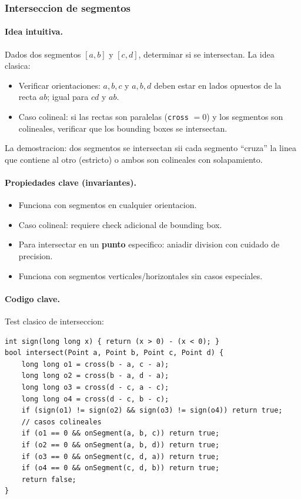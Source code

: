 ﻿\subsubsection{Interseccion de segmentos}

\paragraph{Idea intuitiva.}
Dados dos segmentos $[a, b]$ y $[c, d]$, determinar si se intersectan. La idea clasica:
\begin{itemize}\setlength\itemsep{0pt}
	\item Verificar orientaciones: $a, b, c$ y $a, b, d$ deben estar en lados opuestos de la recta $ab$; igual para $cd$ y $ab$.
	\item Caso colineal: si las rectas son paralelas (\texttt{cross} $= 0$) y los segmentos son colineales, verificar que los bounding boxes se intersectan.
\end{itemize}
La demostracion: dos segmentos se intersectan sii cada segmento ``cruza'' la linea que contiene al otro (estricto) o ambos son colineales con solapamiento.

\paragraph{Propiedades clave (invariantes).}
\begin{itemize}\setlength\itemsep{0pt}
	\item Funciona con segmentos en cualquier orientacion.
	\item Caso colineal: requiere check adicional de bounding box.
	\item Para intersectar en un \textbf{punto} especifico: aniadir division con cuidado de precision.
	\item Funciona con segmentos verticales/horizontales sin casos especiales.
\end{itemize}

\paragraph{Codigo clave.}
Test clasico de interseccion:
\begin{verbatim}
int sign(long long x) { return (x > 0) - (x < 0); }
bool intersect(Point a, Point b, Point c, Point d) {
    long long o1 = cross(b - a, c - a);
    long long o2 = cross(b - a, d - a);
    long long o3 = cross(d - c, a - c);
    long long o4 = cross(d - c, b - c);
    if (sign(o1) != sign(o2) && sign(o3) != sign(o4)) return true;
    // casos colineales
    if (o1 == 0 && onSegment(a, b, c)) return true;
    if (o2 == 0 && onSegment(a, b, d)) return true;
    if (o3 == 0 && onSegment(c, d, a)) return true;
    if (o4 == 0 && onSegment(c, d, b)) return true;
    return false;
}
\end{verbatim}

